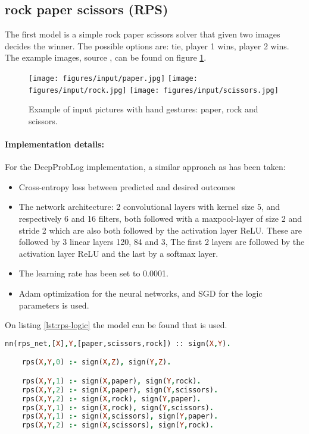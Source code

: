 \subsection{rock paper scissors (RPS)}
The first model is a simple rock paper scissors solver that given two images decides the winner. The possible options are: tie, player 1 wins, player 2 wins. The example images, source \cite{RPSLS-database}, can be found on figure \ref{fig:rps_input}. 

\begin{figure}[htp]
    \centering
    \texttt{[image: figures/input/paper.jpg]}\hfill
    \texttt{[image: figures/input/rock.jpg]}\hfill
    \texttt{[image: figures/input/scissors.jpg]}
    \caption{Example of input pictures with hand gestures: paper, rock and scissors\cite{RPSLS-database}.} %
    \label{fig:rps_input}
\end{figure}

\paragraph{Implementation details:} For the DeepProbLog implementation, a similar approach as \cite{DBLP} has been taken:
\begin{itemize}
    \item Cross-entropy loss between predicted and desired outcomes
    \item The network architecture: 2 convolutional layers with kernel size 5, and respectively 6 and 16 filters, both followed with a maxpool-layer of size 2 and stride 2 which are also both followed by the activation layer ReLU. These are followed by 3 linear layers 120, 84 and 3, The first 2 layers are followed by the activation layer ReLU and the last by a softmax layer. \item The learning rate has been set to 0.0001. 
    \item Adam \cite{kingma2014adam} optimization for the neural networks, and SGD for the logic parameters is used.
  \end{itemize}
  On listing \ref{lst:rps-logic} the model can be found that is used.

  \begin{lstlisting}[label={lst:rps-logic},language=Prolog,frame=single,caption={Rock paper scissors DeepProbLog model},captionpos=b]
    nn(rps_net,[X],Y,[paper,scissors,rock]) :: sign(X,Y).

    rps(X,Y,0) :- sign(X,Z), sign(Y,Z).

    rps(X,Y,1) :- sign(X,paper), sign(Y,rock).
    rps(X,Y,2) :- sign(X,paper), sign(Y,scissors).
    rps(X,Y,2) :- sign(X,rock), sign(Y,paper).
    rps(X,Y,1) :- sign(X,rock), sign(Y,scissors).
    rps(X,Y,1) :- sign(X,scissors), sign(Y,paper).
    rps(X,Y,2) :- sign(X,scissors), sign(Y,rock).
    \end{lstlisting}

